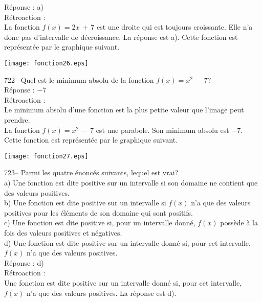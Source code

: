 ﻿\documentclass[letterpaper, 12pt]{article}
\begin{document}
R\'eponse : a)\\

R\'etroaction : \\
La fonction $f(x)=2x\,+\,7$ est une droite qui est toujours croissante.
Elle n'a donc pas d'intervalle de d\'ecroissance.  La r\'eponse est a).
Cette fonction est repr\'esent\'ee par le graphique suivant.\\
    \begin{center}
    \texttt{[image: fonction26.eps]}
    \end{center}


722-- Quel est le minimum absolu de la fonction $f(x)=x^{2}\,-\,7$?\\

R\'eponse : $-7$\\

R\'etroaction : \\
Le minimum absolu d'une fonction est la plus petite valeur que l'image peut
prendre.\\
La fonction $f(x)=x^{2}\,-\,7$ est une parabole.  Son minimum absolu est
$-7$.  Cette fonction est repr\'esent\'ee par le graphique suivant.\\
    \begin{center}
    \texttt{[image: fonction27.eps]}
    \end{center}


723-- Parmi les quatre \'enonc\'es suivants, lequel est vrai?\\
a) Une fonction est dite positive sur un intervalle si son domaine ne
contient que des valeurs positives.\\
b) Une fonction est dite positive sur un intervalle si $f(x)$ n'a que des
valeurs positives pour les \'el\'ements de son domaine qui sont positifs.\\
c) Une fonction est dite positive si, pour un intervalle donn\'e, $f(x)$
poss\`ede \`a la fois des valeurs positives et n\'egatives.\\
d) Une fonction est dite positive sur un intervalle donn\'e si, pour cet
intervalle, $f(x)$ n'a que des valeurs positives.  \\

R\'eponse :  d)\\

R\'etroaction : \\
Une fonction est dite positive sur un intervalle donn\'e si, pour cet
intervalle, $f(x)$ n'a que des valeurs positives. La r\'eponse est d).\\
\end{document}
